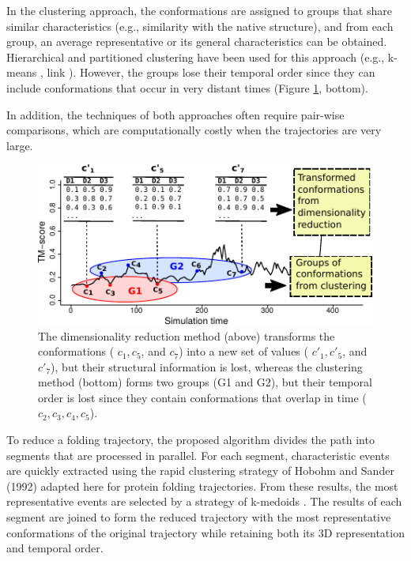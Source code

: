 \documentclass[twocolumn]{bmcart}%
\begin{document}
In the clustering approach, the conformations are assigned to groups that share similar characteristics (e.g., similarity with the native structure), and from each group, an average representative or its general characteristics can be obtained. Hierarchical and partitioned clustering have been used for this approach (e.g., k-means \cite{Doerr2017}, link \cite{Shao2007}). However, the groups lose their temporal order since they can include conformations that occur in very distant times (Figure \ref{fig:lost-info-dimensionality}, bottom).

In addition, the techniques of both approaches often require pair-wise comparisons, which are computationally costly when the trajectories are very large.

\begin{figure}[th]
\includegraphics[viewport=0bp 0bp 210bp 104bp,scale=1.05]{images/02-2RN2-trajectory-weakness}

\caption{ The dimensionality reduction method (above) transforms the conformations ( $c_{1},c_{5}$, and $c_{7}$) into a new set of values ( $c'_{1},c'_{5}$, and $c'_{7}$), but their structural information is lost, whereas the clustering method (bottom) forms two groups (G1 and G2), but their temporal order is lost since they contain conformations that overlap in time ($c_{2},c_{3},c_{4},c_{5}$). \label{fig:lost-info-dimensionality}}
\end{figure}

To reduce a folding trajectory, the proposed algorithm divides the path into segments that are processed in parallel. For each segment, characteristic events are quickly extracted using the rapid clustering strategy of Hobohm and Sander (1992) adapted here for protein folding trajectories. From these results, the most representative events are selected by a strategy of k-medoids \cite{Kaufman1990}. The results of each segment are joined to form the reduced trajectory with the most representative conformations of the original trajectory while retaining both its 3D representation and temporal order.
\end{document}
